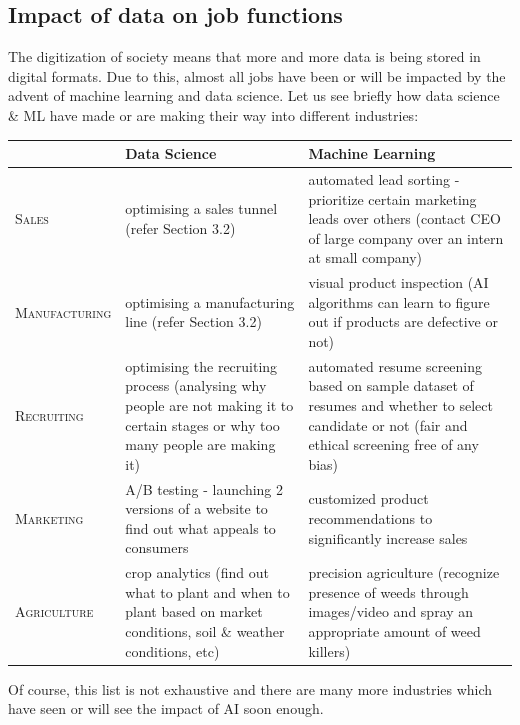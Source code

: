 \documentclass{article}[a4paper,12pt]
\theoremstyle{definition}
\begin{document}
\subsection{Impact of data on job functions}
The digitization of society means that more and more data is being stored in digital formats. Due to this, almost all jobs have been or will be impacted by the advent of machine learning and data science. Let us see briefly how data science \& ML have made or are making their way into different industries:
\begin{center}
\begin{tabular}{|p{10em}|p{17em}|p{17em}|}
\hline
 & \textbf{Data Science} & \textbf{Machine Learning} \\
\hline
\textsc{Sales} & optimising a sales tunnel (refer Section 3.2) & automated lead sorting - prioritize certain marketing leads over others (contact CEO of large company over an intern at small company)\\
\hline
\textsc{Manufacturing} & optimising a manufacturing line (refer Section 3.2) & visual product inspection (AI algorithms can learn to figure out if products are defective or not)\\
\hline
\textsc{Recruiting} & optimising the recruiting process (analysing why people are not making it to certain stages or why too many people are making it) & automated resume screening based on sample dataset of resumes and whether to select candidate or not (fair and ethical screening free of any bias)\\
\hline
\textsc{Marketing} & A/B testing - launching 2 versions of a website to find out what appeals to consumers & customized product recommendations to significantly increase sales\\
\hline
\textsc{Agriculture} & crop analytics (find out what to plant and when to plant based on market conditions, soil \& weather conditions, etc) & precision agriculture (recognize presence of weeds through images/video and spray an appropriate amount of weed killers)\\
\hline
\end{tabular}
\end{center}
Of course, this list is not exhaustive and there are many more industries which have seen or will see the impact of AI soon enough.
\end{document}
